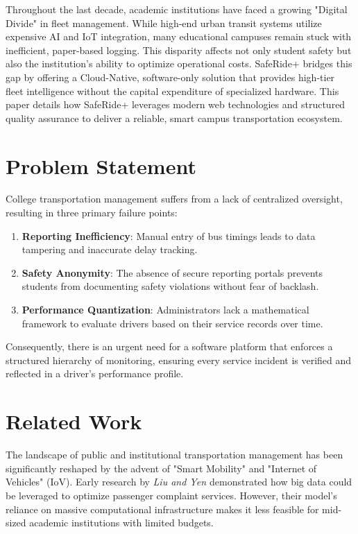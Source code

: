 \documentclass[conference]{IEEEtran}
\begin{document}
Throughout the last decade, academic institutions have faced a growing "Digital Divide" in fleet management. While high-end urban transit systems utilize expensive AI and IoT integration, many educational campuses remain stuck with inefficient, paper-based logging. This disparity affects not only student safety but also the institution's ability to optimize operational costs. SafeRide+ bridges this gap by offering a Cloud-Native, software-only solution that provides high-tier fleet intelligence without the capital expenditure of specialized hardware. This paper details how SafeRide+ leverages modern web technologies and structured quality assurance to deliver a reliable, smart campus transportation ecosystem.

\section{Problem Statement}
College transportation management suffers from a lack of centralized oversight, resulting in three primary failure points: 
\begin{enumerate}
    \item \textbf{Reporting Inefficiency}: Manual entry of bus timings leads to data tampering and inaccurate delay tracking. 
    \item \textbf{Safety Anonymity}: The absence of secure reporting portals prevents students from documenting safety violations without fear of backlash. 
    \item \textbf{Performance Quantization}: Administrators lack a mathematical framework to evaluate drivers based on their service records over time. 
\end{enumerate}
Consequently, there is an urgent need for a software platform that enforces a structured hierarchy of monitoring, ensuring every service incident is verified and reflected in a driver's performance profile.

\section{Related Work}
The landscape of public and institutional transportation management has been significantly reshaped by the advent of "Smart Mobility" and "Internet of Vehicles" (IoV). Early research by \textit{Liu and Yen \cite{b2}} demonstrated how big data could be leveraged to optimize passenger complaint services. However, their model’s reliance on massive computational infrastructure makes it less feasible for mid-sized academic institutions with limited budgets.
\end{document}

